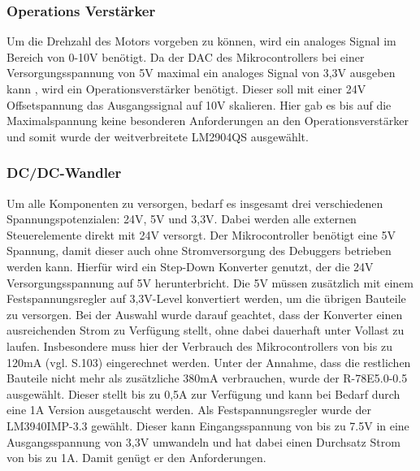 \subsubsection{Operations Verstärker}
Um die Drehzahl des Motors vorgeben zu können, wird ein analoges Signal im Bereich von 0-10V benötigt. Da der \ac{DAC} des Mikrocontrollers bei einer Versorgungsspannung von 5V maximal ein analoges Signal von 3,3V ausgeben kann \cite{STM32}, wird ein Operationsverstärker benötigt. Dieser soll mit einer 24V Offsetspannung das Ausgangssignal auf 10V skalieren. Hier gab es bis auf die Maximalspannung keine besonderen Anforderungen an den Operationsverstärker und somit wurde der weitverbreitete LM2904QS ausgewählt.
\subsubsection{DC/DC-Wandler}
Um alle Komponenten zu versorgen, bedarf es insgesamt drei verschiedenen Spannungspotenzialen: 24V, 5V und 3,3V. Dabei werden alle externen Steuerelemente direkt mit 24V versorgt. Der Mikrocontroller benötigt eine 5V Spannung, damit dieser auch ohne Stromversorgung des Debuggers betrieben werden kann. Hierfür wird ein Step-Down Konverter genutzt, der die 24V Versorgungsspannung auf 5V herunterbricht. Die 5V müssen zusätzlich mit einem Festspannungsregler auf 3,3V-Level konvertiert werden, um die übrigen Bauteile zu versorgen. Bei der Auswahl wurde darauf geachtet, dass der Konverter einen ausreichenden Strom zu Verfügung stellt, ohne dabei dauerhaft unter Vollast zu laufen. Insbesondere muss hier der Verbrauch des Mikrocontrollers von bis zu 120mA (vgl. \cite{STM32_Electrical} S.103) eingerechnet werden. Unter der Annahme, dass die restlichen Bauteile nicht mehr als zusätzliche 380mA verbrauchen, wurde der R-78E5.0-0.5 ausgewählt. Dieser stellt bis zu 0,5A zur Verfügung und kann bei Bedarf durch eine 1A Version ausgetauscht werden. Als Festspannungsregler wurde der LM3940IMP-3.3 gewählt. Dieser kann Eingangsspannung von bis zu 7.5V in eine Ausgangsspannung von 3,3V umwandeln und hat dabei einen Durchsatz Strom von bis zu 1A. Damit genügt er den Anforderungen.
